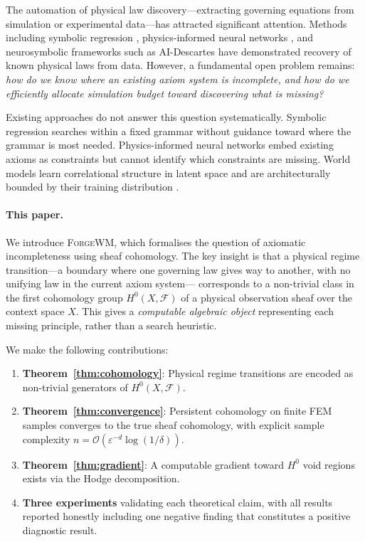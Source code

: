 \documentclass[twoside,11pt]{article}
\newcommand{\FA}{\mathcal{F}}
\newcommand{\ForgeWM}{\textsc{ForgeWM}\xspace}
\begin{document}
The automation of physical law discovery---extracting governing
equations from simulation or experimental data---has attracted
significant attention. Methods including symbolic regression
\citep{schmidt2009distilling}, physics-informed neural networks
\citep{raissi2019physics}, and neurosymbolic frameworks such as
AI-Descartes \citep{cornelio2023combining} have demonstrated recovery
of known physical laws from data. However, a fundamental open problem
remains: \emph{how do we know where an existing axiom system is
incomplete, and how do we efficiently allocate simulation budget toward
discovering what is missing?}

Existing approaches do not answer this question systematically.
Symbolic regression searches within a fixed grammar without guidance
toward where the grammar is most needed. Physics-informed neural
networks embed existing axioms as constraints but cannot identify which
constraints are missing. World models learn correlational structure in
latent space and are architecturally bounded by their training
distribution \citep{lecun2022path,consensus2025survey}.

\paragraph{This paper.}
We introduce \ForgeWM, which formalises the question of axiomatic
incompleteness using sheaf cohomology. The key insight is that a
physical regime transition---a boundary where one governing law gives
way to another, with no unifying law in the current axiom system---
corresponds to a non-trivial class in the first cohomology group
$H^0(X, \FA)$ of a physical observation sheaf over the context space
$X$. This gives a \emph{computable algebraic object} representing each
missing principle, rather than a search heuristic.

We make the following contributions:

\begin{enumerate}[label=(\roman*)]
\item \textbf{Theorem~\ref{thm:cohomology}}: Physical regime
  transitions are encoded as non-trivial generators of $H^0(X,\FA)$.
\item \textbf{Theorem~\ref{thm:convergence}}: Persistent cohomology on
  finite FEM samples converges to the true sheaf cohomology, with
  explicit sample complexity $n = \mathcal{O}(\varepsilon^{-d}
  \log(1/\delta))$.
\item \textbf{Theorem~\ref{thm:gradient}}: A computable gradient
  toward $H^0$ void regions exists via the Hodge decomposition.
\item \textbf{Three experiments} validating each theoretical claim,
  with all results reported honestly including one negative finding that
  constitutes a positive diagnostic result.
\end{enumerate}
\end{document}
